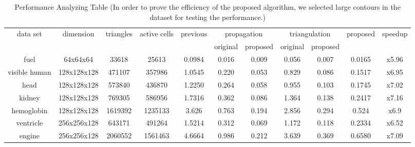 \documentclass[11pt, b5paper]{report}
\begin{document}
\begin{landscape}
  \begin{table}[h]
    \centering
    \begin{tabular}{|c|c|c|c|c|c|c|c|c|c|c|}
      \hline
      \multirow{2}{*}{data set} & \multirow{2}{*}{dimension} & \multirow{2}{*}{triangles} & \multirow{2}{*}{active cells} & \multirow{2}{*}{previous} & \multicolumn{2}{|c|}{propagation}  & \multicolumn{2}{|c|}{triangulation} & \multirow{2}{*}{proposed} & \multirow{2}{*}{speedup} \\ \cline{6-9}
              &  &  &  &  & \multirow{1}{*}{original} & \multirow{1}{*}{proposed} & \multirow{1}{*}{original} & \multirow{1}{*}{proposed} & & \\
      \hline
      fuel        & 64x64x64 & 33618 & 25613 & 0.0984 & 0.016 & 0.009 & 0.056 & 0.007 & 0.0165 & x5.96  \\
      visible human & 128x128x128 & 471107 & 357986 & 1.0545 & 0.220 & 0.053 & 0.829 & 0.086 & 0.1517 & x6.95 \\
      head        & 128x128x128 & 573840 & 436870 & 1.2250 & 0.264 & 0.058 & 0.955  & 0.103 & 0.1745 & x7.02 \\
      kidney      & 128x128x128 & 769305 & 586956 & 1.7316 & 0.362 & 0.086  & 1.364  & 0.138 & 0.2417 & x7.16 \\
      hemoglobin  & 128x128x128 & 1619392 & 1235133 & 3.626 & 0.763 & 0.194 & 2.856 & 0.294 & 0.524 & x6.9 \\
      ventricle   & 256x256x128 & 643171 & 491264 & 1.5214 & 0.312 & 0.069 & 1.172  & 0.118 & 0.2334 & x6.52 \\
      engine      & 256x256x128 & 2060552 & 1561463 & 4.6664 & 0.986 & 0.212 & 3.639  & 0.369 & 0.6580 & x7.09 \\
      \hline
    \end{tabular} 
    \caption[Performance Analyzing Table]{Performance Analyzing Table 
      (In order to prove the efficiency of the proposed algorithm, we selected large contours in the dataset for
  testing the performance.)
}
\end{table}
\end{landscape}
\end{document}
